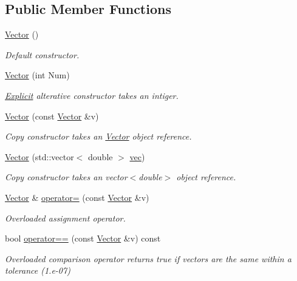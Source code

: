 \subsection*{Public Member Functions}
\begin{DoxyCompactItemize}
\item 
\hyperlink{classVector_a6f80c73b5f18dcf3f8e36065bdc8b9e5}{Vector} ()
\begin{DoxyCompactList}\small\item\em Default constructor. \end{DoxyCompactList}\item 
\hyperlink{classVector_acbdf66550f2caa0a64e0b356fb63a277}{Vector} (int Num)
\begin{DoxyCompactList}\small\item\em \hyperlink{classExplicit}{Explicit} alterative constructor takes an intiger. \end{DoxyCompactList}\item 
\hyperlink{classVector_a5f04e343b7306ad11f8a82c89b486764}{Vector} (const \hyperlink{classVector}{Vector} \&v)
\begin{DoxyCompactList}\small\item\em Copy constructor takes an \hyperlink{classVector}{Vector} object reference. \end{DoxyCompactList}\item 
\hyperlink{classVector_aae1353b115bc63a9115a8619659a4179}{Vector} (std\+::vector$<$ double $>$ \hyperlink{classVector_accafb2e9a427f9c9f2cf35278ea7b2db}{vec})
\begin{DoxyCompactList}\small\item\em Copy constructor takes an vector$<$double$>$ object reference. \end{DoxyCompactList}\item 
\hyperlink{classVector}{Vector} \& \hyperlink{classVector_ae48c467a9f65d60e2f7455aba4ca1239}{operator=} (const \hyperlink{classVector}{Vector} \&v)
\begin{DoxyCompactList}\small\item\em Overloaded assignment operator. \end{DoxyCompactList}\item 
bool \hyperlink{classVector_afe95adbfc44a173a404039b717df35a5}{operator==} (const \hyperlink{classVector}{Vector} \&v) const 
\begin{DoxyCompactList}\small\item\em Overloaded comparison operator returns true if vectors are the same within a tolerance (1.\+e-\/07) \end{DoxyCompactList}\item 

\end{DoxyCompactItemize}

